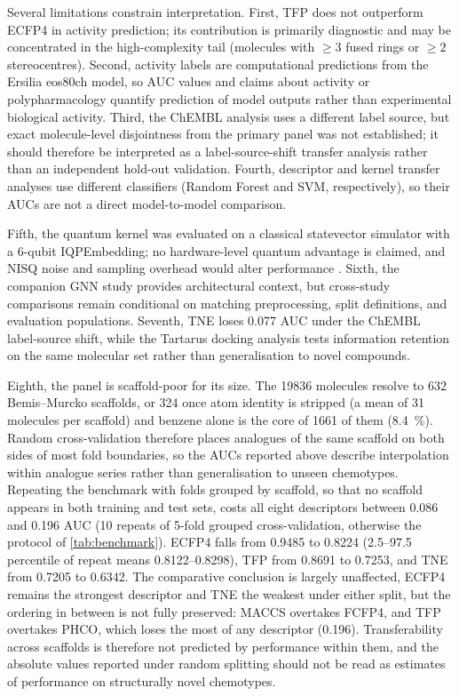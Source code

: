 \documentclass[11pt,a4paper]{article}
\begin{document}
Several limitations constrain interpretation. First, TFP does not outperform ECFP4 in activity prediction; its contribution is primarily diagnostic and may be concentrated in the high-complexity tail (molecules with $\geq 3$ fused rings or $\geq 2$ stereocentres). Second, activity labels are computational predictions from the Ersilia eos80ch model, so AUC values and claims about activity or polypharmacology quantify prediction of model outputs rather than experimental biological activity. Third, the ChEMBL analysis uses a different label source, but exact molecule-level disjointness from the primary panel was not established; it should therefore be interpreted as a label-source-shift transfer analysis rather than an independent hold-out validation. Fourth, descriptor and kernel transfer analyses use different classifiers (Random Forest and SVM, respectively), so their AUCs are not a direct model-to-model comparison.

Fifth, the quantum kernel was evaluated on a classical statevector simulator with a 6-qubit IQPEmbedding; no hardware-level quantum advantage is claimed, and NISQ noise and sampling overhead would alter performance \citep{preskill2018nisq}. Sixth, the companion GNN study \citep{temgoua2027gnn} provides architectural context, but cross-study comparisons remain conditional on matching preprocessing, split definitions, and evaluation populations. Seventh, TNE loses \num{0.077} AUC under the ChEMBL label-source shift, while the Tartarus docking analysis tests information retention on the same molecular set rather than generalisation to novel compounds.

Eighth, the panel is scaffold-poor for its size. The \num{19836} molecules resolve to \num{632} Bemis--Murcko scaffolds, or \num{324} once atom identity is stripped (a mean of \num{31} molecules per scaffold) and benzene alone is the core of \num{1661} of them (\qty{8.4}{\percent}). Random cross-validation therefore places analogues of the same scaffold on both sides of most fold boundaries, so the AUCs reported above describe interpolation within analogue series rather than generalisation to unseen chemotypes. Repeating the benchmark with folds grouped by scaffold, so that no scaffold appears in both training and test sets, costs all eight descriptors between \num{0.086} and \num{0.196} AUC (10 repeats of 5-fold grouped cross-validation, otherwise the protocol of \cref{tab:benchmark}). ECFP4 falls from \num{0.9485} to \num{0.8224} (2.5--97.5 percentile of repeat means \num{0.8122}--\num{0.8298}), TFP from \num{0.8691} to \num{0.7253}, and TNE from \num{0.7205} to \num{0.6342}. The comparative conclusion is largely unaffected, ECFP4 remains the strongest descriptor and TNE the weakest under either split, but the ordering in between is not fully preserved: MACCS overtakes FCFP4, and TFP overtakes PHCO, which loses the most of any descriptor (\num{0.196}). Transferability across scaffolds is therefore not predicted by performance within them, and the absolute values reported under random splitting should not be read as estimates of performance on structurally novel chemotypes.
\end{document}
